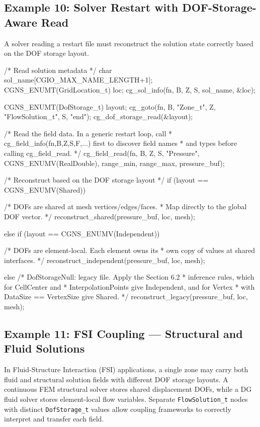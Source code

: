 \documentclass[11pt,letterpaper]{article}
\makeatletter
\let\cgns@orig@lstlisting\lstlisting
\let\cgns@endorig@lstlisting\endlstlisting
\renewenvironment{lstlisting}
  {\par\needspace{5\baselineskip}\nolinenumbers\cgns@orig@lstlisting}
  {\cgns@endorig@lstlisting\par\linenumbers}
\makeatother
\begin{document}
\subsection{Example 10: Solver Restart with DOF-Storage-Aware Read}
\label{ex:restart}

A solver reading a restart file must reconstruct the solution state
correctly based on the DOF storage layout.

\begin{lstlisting}[language=C]
/* Read solution metadata */
char sol_name[CGIO_MAX_NAME_LENGTH+1];
CGNS_ENUMT(GridLocation_t) loc;
cg_sol_info(fn, B, Z, S, sol_name, &loc);

CGNS_ENUMT(DofStorage_t) layout;
cg_goto(fn, B, "Zone_t", Z, "FlowSolution_t", S, "end");
cg_dof_storage_read(&layout);

/* Read the field data.  In a generic restart loop, call
 * cg_field_info(fn,B,Z,S,F,...) first to discover field names
 * and types before calling cg_field_read. */
cg_field_read(fn, B, Z, S, "Pressure",
    CGNS_ENUMV(RealDouble), range_min, range_max,
    pressure_buf);

/* Reconstruct based on the DOF storage layout */
if (layout == CGNS_ENUMV(Shared)) {
    /* DOFs are shared at mesh vertices/edges/faces.
     * Map directly to the global DOF vector. */
    reconstruct_shared(pressure_buf, loc, mesh);

} else if (layout == CGNS_ENUMV(Independent)) {
    /* DOFs are element-local.  Each element owns its
     * own copy of values at shared interfaces. */
    reconstruct_independent(pressure_buf, loc, mesh);

} else {
    /* DofStorageNull: legacy file.  Apply the Section 6.2
     * inference rules, which for CellCenter and
     * InterpolationPoints give Independent, and for Vertex
     * with DataSize == VertexSize give Shared. */
    reconstruct_legacy(pressure_buf, loc, mesh);
}
\end{lstlisting}

\subsection{Example 11: FSI Coupling --- Structural and Fluid Solutions}
\label{ex:fsi}

In Fluid-Structure Interaction (FSI) applications, a single zone may
carry both fluid and structural solution fields with different
DOF storage layouts.  A continuous FEM structural solver stores shared
displacement DOFs, while a DG fluid solver stores element-local flow
variables.  Separate \texttt{FlowSolution\_t} nodes with distinct
\texttt{DofStorage\_t} values allow coupling frameworks to correctly
interpret and transfer each field.
\end{document}
